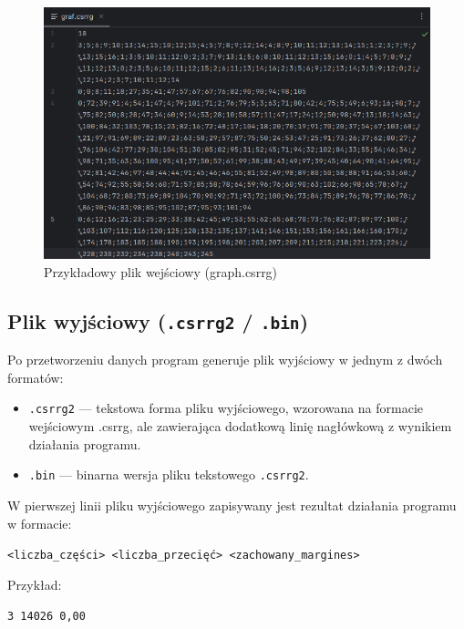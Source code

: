 \documentclass{article}
\begin{document}
        \begin{figure}[H]
            \centering
            \includegraphics[width=1\linewidth]{img/input_csrrg.png}
            \caption{Przykładowy plik wejściowy (graph.csrrg)}
            \label{fig:input_csrrg}
        \end{figure}
    
    \subsection{Plik wyjściowy (\texttt{.csrrg2} / \texttt{.bin})}

    Po przetworzeniu danych program generuje plik wyjściowy w jednym z dwóch formatów:
    \begin{itemize}
        \item \texttt{.csrrg2} — tekstowa forma pliku wyjściowego, wzorowana na formacie wejściowym .csrrg, ale zawierająca dodatkową linię nagłówkową z wynikiem działania programu.
        \item \texttt{.bin} — binarna wersja pliku tekstowego \texttt{.csrrg2}.
    \end{itemize}
    
    W pierwszej linii pliku wyjściowego zapisywany jest rezultat działania programu w formacie:
    \begin{center}
    \texttt{<liczba\_części> <liczba\_przecięć> <zachowany\_margines>}
    \end{center}
    Przykład:
    \begin{center}
    \texttt{3 14026 0,00}
    \end{center}
\end{document}
